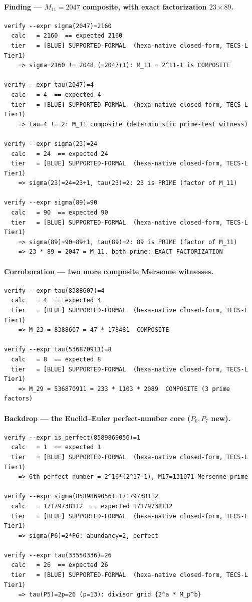 \documentclass[11pt,a4paper]{article}
\theoremstyle{definition}
\begin{document}
\paragraph{Finding --- $M_{11}=2047$ composite, with exact factorization $23\times 89$.}
\begin{verbatim}
verify --expr sigma(2047)=2160
  calc   = 2160  == expected 2160
  tier   = [BLUE] SUPPORTED-FORMAL  (hexa-native closed-form, TECS-L Tier1)
    => sigma=2160 != 2048 (=2047+1): M_11 = 2^11-1 is COMPOSITE

verify --expr tau(2047)=4
  calc   = 4  == expected 4
  tier   = [BLUE] SUPPORTED-FORMAL  (hexa-native closed-form, TECS-L Tier1)
    => tau=4 != 2: M_11 composite (deterministic prime-test witness)

verify --expr sigma(23)=24
  calc   = 24  == expected 24
  tier   = [BLUE] SUPPORTED-FORMAL  (hexa-native closed-form, TECS-L Tier1)
    => sigma(23)=24=23+1, tau(23)=2: 23 is PRIME (factor of M_11)

verify --expr sigma(89)=90
  calc   = 90  == expected 90
  tier   = [BLUE] SUPPORTED-FORMAL  (hexa-native closed-form, TECS-L Tier1)
    => sigma(89)=90=89+1, tau(89)=2: 89 is PRIME (factor of M_11)
    => 23 * 89 = 2047 = M_11, both prime: EXACT FACTORIZATION
\end{verbatim}

\paragraph{Corroboration --- two more composite Mersenne witnesses.}
\begin{verbatim}
verify --expr tau(8388607)=4
  calc   = 4  == expected 4
  tier   = [BLUE] SUPPORTED-FORMAL  (hexa-native closed-form, TECS-L Tier1)
    => M_23 = 8388607 = 47 * 178481  COMPOSITE

verify --expr tau(536870911)=8
  calc   = 8  == expected 8
  tier   = [BLUE] SUPPORTED-FORMAL  (hexa-native closed-form, TECS-L Tier1)
    => M_29 = 536870911 = 233 * 1103 * 2089  COMPOSITE (3 prime factors)
\end{verbatim}

\paragraph{Backdrop --- the Euclid--Euler perfect-number core ($P_6, P_7$ new).}
\begin{verbatim}
verify --expr is_perfect(8589869056)=1
  calc   = 1  == expected 1
  tier   = [BLUE] SUPPORTED-FORMAL  (hexa-native closed-form, TECS-L Tier1)
    => 6th perfect number = 2^16*(2^17-1), M17=131071 Mersenne prime

verify --expr sigma(8589869056)=17179738112
  calc   = 17179738112  == expected 17179738112
  tier   = [BLUE] SUPPORTED-FORMAL  (hexa-native closed-form, TECS-L Tier1)
    => sigma(P6)=2*P6: abundancy=2, perfect

verify --expr tau(33550336)=26
  calc   = 26  == expected 26
  tier   = [BLUE] SUPPORTED-FORMAL  (hexa-native closed-form, TECS-L Tier1)
    => tau(P5)=2p=26 (p=13): divisor grid {2^a * M_p^b}
\end{verbatim}
\end{document}
